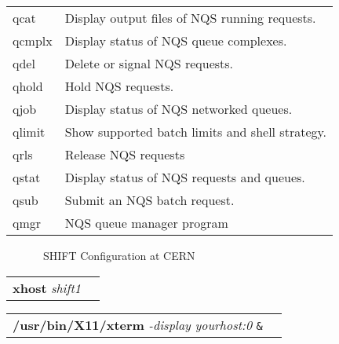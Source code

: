 \newpage

{\samepage \clearpage \begin{tabular}{ll}
qcat   & Display output files of NQS running requests.          \\  
qcmplx & Display status of NQS queue complexes.                 \\  
qdel   & Delete or signal NQS requests.                         \\  
qhold  & Hold NQS requests.                                     \\  
qjob   & Display status of NQS networked queues.                \\  
qlimit & Show supported batch limits and shell strategy.        \\  
qrls   & Release NQS requests                                   \\  
qstat  & Display status of NQS requests and queues.             \\  
qsub   & Submit an NQS batch request.                           \\  
qmgr   & NQS queue manager program                              \\  
\end{tabular}
}


\newpage

{\samepage \clearpage \begin{figure}%
\centerline\mbox{}
\caption{~\label{fig_gen_arch}SHIFT Configuration at CERN}
\end{figure}
}


\newpage

{\samepage \clearpage \begin{tabular}{ll}
{\bf xhost }{\it shift1}
\end{tabular}
}


\newpage

{\samepage \clearpage \begin{tabular}{ll}
{\bf /usr/bin/X11/xterm } {\it -display yourhost:0}  {\tt \&}
\end{tabular}
}


